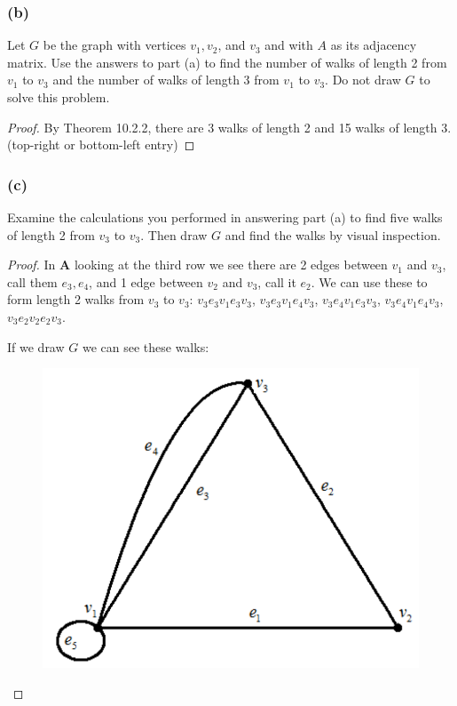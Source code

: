 \documentclass[14pt]{extarticle}
\begin{document}
\subsubsection{(b)}
Let \(G\) be the graph with vertices \(v_1, v_2\), and \(v_3\) and with \(A\) as its adjacency matrix. Use the answers to 
part (a) to find the number of walks of length 2 from \(v_1\) to \(v_3\) and the number of walks of length 3 from \(v_1\) to 
\(v_3\). Do not draw \(G\) to solve this problem.

\begin{proof}
By Theorem 10.2.2, there are 3 walks of length 2 and 15 walks of length 3. (top-right or bottom-left entry)
\end{proof}

\subsubsection{(c)}
Examine the calculations you performed in answering part (a) to find five walks of length 2 from \(v_3\) to \(v_3\). Then 
draw \(G\) and find the walks by visual inspection.

\begin{proof}
In {\bf A} looking at the third row we see there are 2 edges between \(v_1\) and \(v_3\), call them \(e_3, e_4\), and 1 
edge between \(v_2\) and \(v_3\), call it \(e_2\). We can use these to form length 2 walks from \(v_3\) to \(v_3\): 
\(v_3e_3v_1e_3v_3\), \(v_3e_3v_1e_4v_3\), \(v_3e_4v_1e_3v_3\), \(v_3e_4v_1e_4v_3\), \(v_3e_2v_2e_2v_3\).

If we draw \(G\) we can see these walks:

\begin{figure}[ht!]
\centering
\includegraphics[scale=0.15]{../images/10.2.19.c.png}
\end{figure}
\end{proof}
\end{document}
